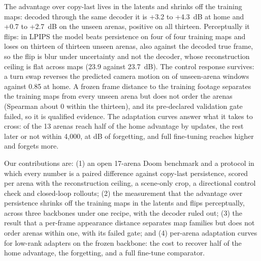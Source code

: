 The advantage over copy-last lives in the latents and shrinks off the training maps: decoded through the same decoder it is +3.2 to +4.3~dB at home and +0.7 to +2.7~dB on the unseen arenas, positive on all thirteen. %
Perceptually it flips: in LPIPS the model beats persistence on four of four training maps and loses on thirteen of thirteen unseen arenas, also against the decoded true frame, so the flip is blur under uncertainty and not the decoder, whose reconstruction ceiling is flat across maps (23.9 against 23.7~dB). %
The control response survives: a turn swap reverses the predicted camera motion on  of unseen-arena windows against 0.85 at home. %
A frozen frame distance to the training footage separates the training maps from every unseen arena but does not order the arenas (Spearman about 0 within the thirteen), and its pre-declared validation gate failed, so it is qualified evidence. %
The adaptation curves answer what it takes to cross:  of the 13 arenas reach half of the home advantage by  updates, the rest later or not within 4,000, at  dB of forgetting, and full fine-tuning reaches higher and forgets more. %

Our contributions are: (1) an open 17-arena Doom benchmark and a protocol in which every number is a paired difference against copy-last persistence, scored per arena with the reconstruction ceiling, a scene-only crop, a directional control check and closed-loop rollouts; (2) the measurement that the advantage over persistence shrinks off the training maps in the latents and flips perceptually, across three backbones under one recipe, with the decoder ruled out; %
(3) the result that a per-frame appearance distance separates map families but does not order arenas within one, with its failed gate; and (4) per-arena adaptation curves for low-rank adapters on the frozen backbone: the cost to recover half of the home advantage, the forgetting, and a full fine-tune comparator. %

